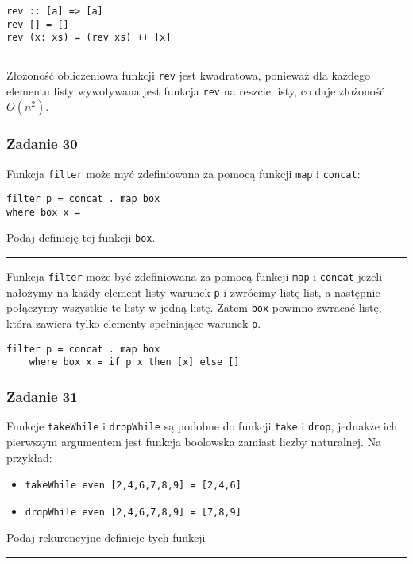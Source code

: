 \documentclass[11pt,a4paper]{article}
\begin{document}
\begin{Verbatim}[frame=single]
rev :: [a] => [a]
rev [] = []
rev (x: xs) = (rev xs) ++ [x]
\end{Verbatim}

\bigskip
\hrule
\bigskip

Złożoność obliczeniowa funkcji \texttt{rev} jest kwadratowa, ponieważ dla każdego elementu listy wywoływana jest funkcja \texttt{rev} na reszcie listy, co daje złożoność \(O(n^2)\).

\subsubsection{Zadanie 30}
Funkcja \texttt{filter} może myć zdefiniowana za pomocą funkcji \texttt{map} i \texttt{concat}:
\begin{Verbatim}[frame=single]
filter p = concat . map box
where box x =
\end{Verbatim}
Podaj definicję tej funkcji \texttt{box}.

\bigskip
\hrule
\bigskip

Funkcja \texttt{filter} może być zdefiniowana za pomocą funkcji \texttt{map} i \texttt{concat} jeżeli nałożymy na każdy element listy warunek \texttt{p} i zwrócimy listę list, a następnie połączymy wszystkie te listy w jedną listę. Zatem \texttt{box} powinno zwracać listę, która zawiera tylko elementy spełniające warunek \texttt{p}.

\begin{Verbatim}[frame=single]
filter p = concat . map box
    where box x = if p x then [x] else []
\end{Verbatim}

\subsubsection{Zadanie 31}
Funkcje \texttt{takeWhile} i \texttt{dropWhile} są podobne do funkcji \texttt{take} i \texttt{drop}, jednakże ich pierwszym argumentem jest funkcja boolowska zamiast liczby naturalnej. Na przykład:
\begin{itemize}
    \item \texttt{takeWhile even [2,4,6,7,8,9] = [2,4,6]}
    \item \texttt{dropWhile even [2,4,6,7,8,9] = [7,8,9]}
\end{itemize}
Podaj rekurencyjne definicje tych funkcji

\bigskip
\hrule
\bigskip
\end{document}
